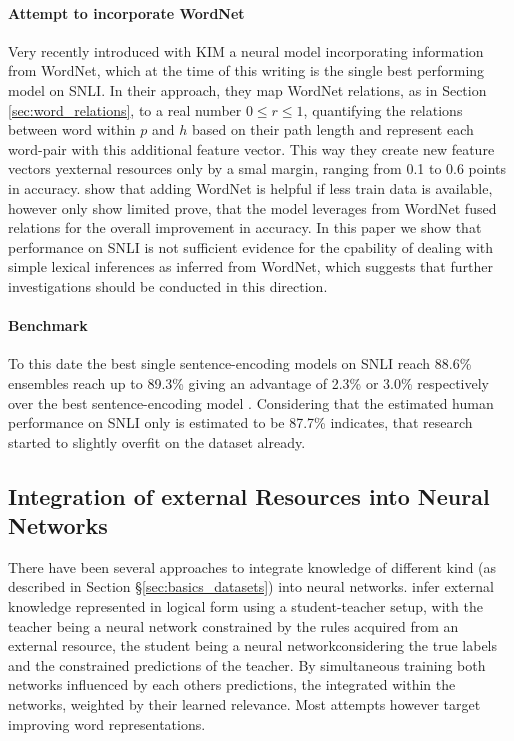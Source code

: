 \paragraph*{Attempt to incorporate WordNet}
Very recently \cite{chen2017natural} introduced with \ac{KIM} a neural model incorporating information from WordNet, which at the time of this writing is the single best performing model on \ac{SNLI}. In their approach, they map WordNet relations, as in Section \ref{sec:word_relations}, to a real number $0 \leq r \leq 1$, quantifying the relations between word within $p$ and $h$ based on their path length and represent each word-pair with this additional feature vector. This way they create new feature vectors yexternal resources only by a smal margin, ranging from 0.1 to 0.6 points in accuracy. \cite{chen2017natural} show that adding WordNet is helpful if less train data is available, however only show limited prove, that the model leverages from WordNet fused relations for the overall improvement in accuracy. In this paper we show that performance on \ac{SNLI} is not sufficient evidence for the cpability of dealing with simple lexical inferences as inferred from WordNet, which suggests that further investigations should be conducted in this direction.

\paragraph*{Benchmark}
To this date the best single sentence-encoding models on \ac{SNLI} reach 88.6\% \citep{chen2017natural} ensembles reach up to 89.3\% \citep{tay2017compare,peters2018deep,ghaeini2018dr} giving an advantage of 2.3\% or 3.0\% respectively over the best sentence-encoding model \citep{im2017distance}. Considering that the estimated human performance on \ac{SNLI} only is estimated to be 87.7\% \citep{gong2017natural} indicates, that research started to slightly overfit on the dataset already. 

\subsection{Integration of external Resources into Neural Networks}\label{sec:ext_res_in_nn}
There have been several approaches to integrate knowledge of different kind (as described in Section §\ref{sec:basics_datasets}) into neural networks. \cite{hu2016deep} infer external knowledge represented in logical form using a student-teacher setup, with the teacher being a neural network constrained by the rules acquired from an external resource, the student being a neural networkconsidering the true labels and the constrained predictions of the teacher. By simultaneous training both networks influenced by each others predictions, the integrated within the networks, weighted by their learned relevance. Most attempts however target improving word representations.

